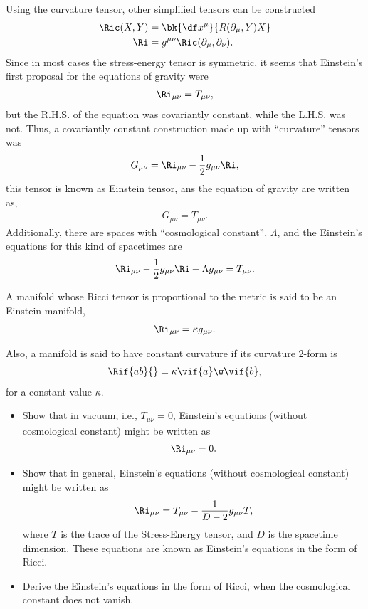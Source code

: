Using the curvature tensor, other simplified tensors can be constructed
\begin{align}
  \Ric(X,Y) &= \bk{\df x^\mu}{R(\partial_\mu,Y)X}\\
  \Ri &= g^{\mu \nu}\Ric(\partial_\mu,\partial_\nu).
\end{align}
Since in most cases the stress-energy tensor is symmetric, it seems that Einstein's first proposal for the equations of gravity were
\begin{align}
  \Ri_{\mu\nu}=T_{\mu\nu},
\end{align}
but the R.H.S. of the equation was covariantly constant, while the L.H.S. was not. Thus, a covariantly constant construction made up with ``curvature'' tensors was
\begin{align}
  G_{\mu\nu} = \Ri_{\mu\nu}-\frac{1}{2}g_{\mu\nu}\Ri,
\end{align}
this tensor is known as Einstein tensor, ans the equation of gravity are written as,
\begin{align}
  G_{\mu\nu}= T_{\mu\nu}.
\end{align}
Additionally, there are spaces with ``cosmological constant'', $\Lambda$, and the Einstein's equations for this kind of spacetimes are
\begin{align}
  \Ri_{\mu\nu}-\frac{1}{2}g_{\mu\nu}\Ri + \Lambda g_{\mu\nu}= T_{\mu\nu}.
\end{align}

A manifold whose Ricci tensor is proportional to the metric is said to be an Einstein manifold,
\begin{align}
  \Ri_{\mu\nu} = \kappa g_{\mu\nu}.
\end{align}

Also, a manifold is said to have constant curvature if its curvature 2-form is
\begin{align}
  \Rif{ab}{} = \kappa\vif{a}\w\vif{b},
\end{align}
for a constant value $\kappa$.

\begin{Ebox}
  \begin{itemize}
  \item Show that in vacuum, i.e., $T_{\mu\nu}=0$, Einstein's equations (without cosmological constant) might be written as
    \begin{align}
      \Ri_{\mu\nu}=0.
    \end{align}
  \item Show that in general, Einstein's equations  (without cosmological constant) might be written as
    \begin{align}
      \Ri_{\mu\nu}= T_{\mu\nu}-\frac{1}{D-2}g_{\mu\nu} T,
    \end{align}
    where $T$ is the trace of the Stress-Energy tensor,  and  $D$ is the spacetime dimension. These equations are known as Einstein's equations in the form of Ricci.
  \item Derive the Einstein's equations in the form of Ricci, when the cosmological constant does not vanish.
  \end{itemize}
\end{Ebox}



